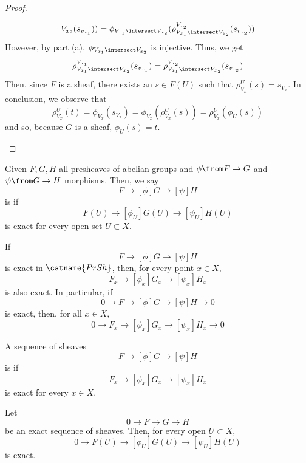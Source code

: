 \documentclass[11pt,leqno,oneside]{amsbook}
\renewcommand{\F}{F} %
\newcommand{\G}{G}
\renewcommand{\H}{H}
\numberwithin{thm}{section}
\begin{document}
\begin{proof}
\begin{enumerate}
\[{        V_{x_2}}(s_{v_{x_1}})) = \phi_{V_{x_1}
        \intersect V_{x_2}}(\rho^{V_{x_2}}_{V_{x_1} \intersect
        V_{x_2}}(s_{v_{x_2}})) 
    \]
    However, by part (a), \(\phi_{V_{x_1} \intersect V_{x_2}}\) is
    injective. Thus, we get \[
      \rho^{V_{x_1}}_{V_{x_1} \intersect
        V_{x_2}}(s_{v_{x_1}}) = \rho^{V_{x_2}}_{V_{x_1} \intersect
        V_{x_2}}(s_{v_{x_2}})
    \]
    Then, since \(\F\) is a sheaf, there exists an \(s \in \F(U)\)
    such that \(\rho^U_{V_x}(s) = s_{V_x}\). In conclusion, we observe
    that \[
      \rho^U_{V_x}(t) = \phi_{V_x}(s_{V_x}) =
      \phi_{V_x}(\rho^U_{V_x}(s)) = \rho^U_{V_x}(\phi_U(s))
    \]
    and so, because \(G\) is a sheaf, \(\phi_U(s) = t\).
  \end{enumerate}
\end{proof}
\begin{defn}
  Given \(\F,\G,\H\) all presheaves of abelian groups and \(\phi \from
  \F \to \G\) and \(\psi \from \G \to \H\) morphisms. Then, we say \[
    \F \to[\phi] \G \to[\psi] \H
  \]
  is  if \[
    \F(U) \to[\phi_U] \G(U) \to[\psi_U] \H(U)
  \]
  is exact for every open set \(U \subset X\).
\end{defn}
\begin{cor}
  If \[
    \F \to[\phi] \G \to[\psi] \H
  \] is exact in \(\catname{PrSh}\),
  then, for every point \(x \in X\), \[
    \F_x \to[\phi_x] \G_x \to[\psi_x] \H_x
  \]
  is also exact. In particular, if \[
    0 \to \F \to[\phi] \G \to[\psi] \H \to 0
  \]
  is exact, then, for all \(x \in X\), \[
    0 \to \F_x \to[\phi_x] \G_x \to[\psi_x] \H_x \to 0
  \]
\end{cor}
\begin{defn}
  A sequence of sheaves \[
    \F \to[\phi] \G \to[\psi] \H
  \] is  if \[
    \F_x \to[\phi_x] \G_x \to[\psi_x] \H_x
  \]
  is exact for every \(x \in X\).
\end{defn}
\begin{thm}\label{section-functor-is-left-exact}
  Let \[
    0 \to \F \to \G \to \H
  \]
  be an exact sequence of sheaves. Then, for every open \(U \subset
  X\), \[
    0 \to \F(U) \to[\phi_U] \G(U) \to[\psi_U] \H(U)
  \]
  is exact.
\end{thm}
\end{document}
